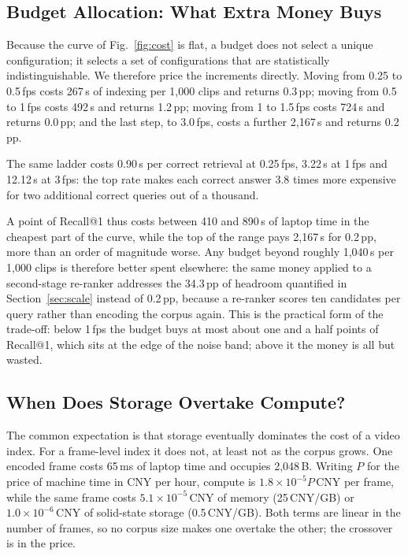 \documentclass[journal]{IEEEtran}
\begin{document}
\subsection{Budget Allocation: What Extra Money Buys}
Because the curve of Fig.~\ref{fig:cost} is flat, a budget does not select a unique configuration; it
selects a set of configurations that are statistically indistinguishable. We therefore price the
increments directly. Moving from 0.25 to 0.5\,fps costs 267\,s of indexing per 1{,}000 clips and
returns 0.3\,pp; moving from 0.5 to 1\,fps costs 492\,s and returns 1.2\,pp; moving from 1 to
1.5\,fps costs 724\,s and returns 0.0\,pp; and the last step, to 3.0\,fps, costs a further
2{,}167\,s and returns 0.2\,pp. 

The same ladder costs 0.90\,s per correct retrieval at 0.25\,fps,
3.22\,s at 1\,fps and 12.12\,s at 3\,fps: the top rate makes each correct answer 3.8 times more
expensive for two additional correct queries out of a thousand. 

A point of Recall@1 thus costs
between 410 and 890\,s of
laptop time in the cheapest part of the curve, while the top of the range pays 2{,}167\,s for
0.2\,pp, more than an order of magnitude worse. Any budget beyond roughly 1{,}040\,s per
1{,}000 clips is therefore better spent
elsewhere: the same
money applied to a second-stage re-ranker addresses the 34.3\,pp of headroom quantified in
Section~\ref{sec:scale} instead of 0.2\,pp, because a re-ranker scores ten candidates per query
rather than encoding the corpus again. This is the practical form of the trade-off: below 1\,fps
the budget buys at most about one and a half points of Recall@1, which sits at the edge of the
noise band; above it the money is all but wasted.

\subsection{When Does Storage Overtake Compute?}
The common expectation is that storage eventually dominates the cost of a video index. For a
frame-level index it does not, at least not as the corpus grows. One encoded frame costs 65\,ms of
laptop time and occupies 2{,}048\,B. Writing $P$ for the price of machine time in CNY per hour,
compute is $1.8\times10^{-5}P$\,CNY per frame, while the same frame costs
$5.1\times10^{-5}$\,CNY of memory (25\,CNY/GB) or $1.0\times10^{-6}$\,CNY of solid-state storage
(0.5\,CNY/GB). Both terms are linear in the number of frames, so no corpus size makes one overtake
the other; the crossover is in the price. 
\end{document}
